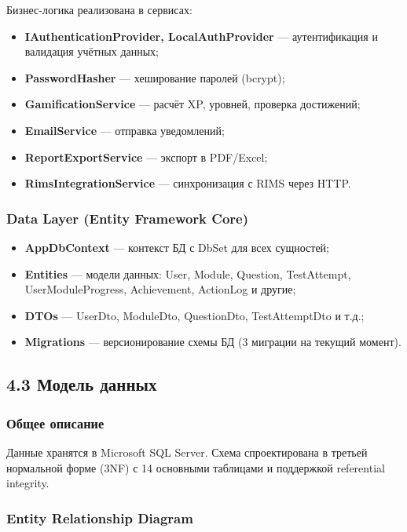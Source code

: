 Бизнес-логика реализована в сервисах:

\begin{itemize}
    \item \textbf{IAuthenticationProvider, LocalAuthProvider} --- аутентификация и валидация учётных данных;
    \item \textbf{PasswordHasher} --- хеширование паролей (bcrypt);
    \item \textbf{GamificationService} --- расчёт XP, уровней, проверка достижений;
    \item \textbf{EmailService} --- отправка уведомлений;
    \item \textbf{ReportExportService} --- экспорт в PDF/Excel;
    \item \textbf{RimsIntegrationService} --- синхронизация с RIMS через HTTP.
\end{itemize}

\subsubsection{Data Layer (Entity Framework Core)}

\begin{itemize}
    \item \textbf{AppDbContext} --- контекст БД с DbSet для всех сущностей;
    \item \textbf{Entities} --- модели данных: User, Module, Question, TestAttempt, UserModuleProgress, Achievement, ActionLog и другие;
    \item \textbf{DTOs} --- UserDto, ModuleDto, QuestionDto, TestAttemptDto и т.д.;
    \item \textbf{Migrations} --- версионирование схемы БД (3 миграции на текущий момент).
\end{itemize}


\subsection{4.3 Модель данных}

\subsubsection{Общее описание}

Данные хранятся в Microsoft SQL Server. Схема спроектирована в третьей нормальной форме (3NF) с 14 основными таблицами и поддержкой referential integrity.

\subsubsection{Entity Relationship Diagram}

